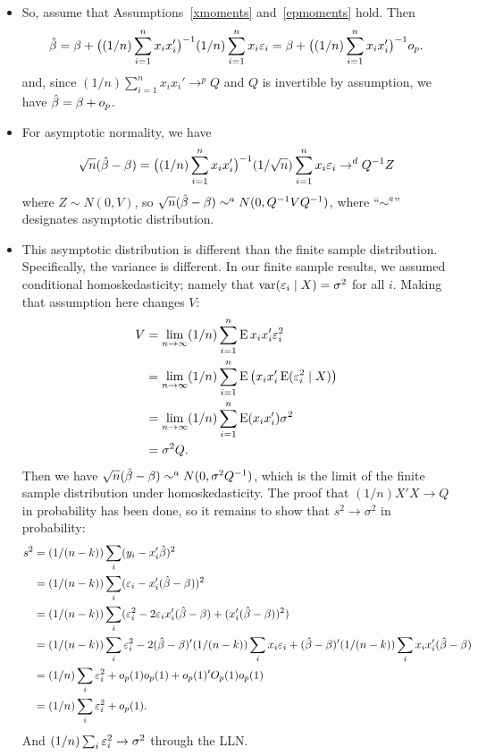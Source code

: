 \begin{itemize}
\item So, assume that Assumptions~\ref{xmoments} and~\ref{epmoments}
  hold.  Then
  \begin{equation*}
    \hat{\beta} 
    = \beta + \big( (1/n) \sum_{i=1}^n x_i x_i' \big)^{-1}
       (1/n) \sum_{i=1}^n x_i \varepsilon_i
    = \beta + \big( (1/n) \sum_{i=1}^n x_i x_i' \big)^{-1} o_p.
  \end{equation*}
  and, since $(1/n) \sum_{i=1}^n x_i x_i' \to^p Q$ and $Q$ is invertible by
  assumption, we have $\hat{\beta} = \beta + o_p$.

\item For asymptotic normality, we have
  \begin{equation*}
    \sqrt{n} (\hat{\beta} - \beta)
    = \big( (1/n) \sum_{i=1}^n x_i x_i' \big)^{-1}
      (1/\sqrt{n}) \sum_{i=1}^n x_i \varepsilon_i \to^d Q^{-1} Z
  \end{equation*}
  where $Z \sim N(0, V)$, so $\sqrt{n} (\hat{\beta} - \beta) \sim^a N(0, Q^{-1} V
  Q^{-1})$, where ``$\sim^a$'' designates asymptotic distribution.

\item This asymptotic distribution is different than the finite sample
  distribution.  Specifically, the variance is different.  In our
  finite sample results, we assumed conditional homoskedasticity;
  namely that $\operatorname{var}(\varepsilon_i \mid X) = \sigma^2$ for all $i$.  Making that
  assumption here changes $V$:
  \begin{align*}
    V
    &= \lim_{n \to \infty} (1/n) \sum_{i=1}^n \operatorname{E} x_i x_i' \varepsilon_i^2 \\
    &= \lim_{n \to \infty} (1/n) \sum_{i=1}^n \operatorname{E} \big( x_i x_i' \operatorname{E}(\varepsilon_i^2 \mid X) \big) \\
    &= \lim_{n \to \infty} (1/n) \sum_{i=1}^n \operatorname{E}( x_i x_i' ) \sigma^2 \\
    &= \sigma^2 Q.
  \end{align*}
  Then we have $\sqrt{n} (\hat{\beta} - \beta) \sim^a N(0, \sigma^2 Q^{-1})$, which is the
  limit of the finite sample distribution under homoskedasticity.  The
  proof that $(1/n) X'X \to Q$ in probability has been done, so it
  remains to show that $s^2 \to \sigma^2$ in probability:
  \begin{align*}
    s^2 &= (1/(n-k)) \sum_i (y_i - x_i'\hat{\beta})^2 \\
    &= (1/(n-k)) \sum_i (\varepsilon_i - x_i'(\hat{\beta} - \beta))^2 \\
    &= (1/(n-k)) \sum_i (\varepsilon_i^2 - 2 \varepsilon_i x_i'(\hat{\beta}-\beta) + (x_i'(\hat{\beta}-\beta))^2) \\
    &= (1/(n-k)) \sum_i \varepsilon_i^2
       - 2 (\hat{\beta} - \beta)' (1/(n-k)) \sum_i  x_i \varepsilon_i
       + (\hat{\beta} - \beta)' (1/(n-k)) \sum_i x_i x_i' (\hat{\beta} - \beta) \\
    &= (1/n) \sum_i \varepsilon_i^2 + o_p(1) o_p(1) + o_p(1)'O_p(1)o_p(1) \\
    &= (1/n) \sum_i \varepsilon_i^2 + o_p(1).
  \end{align*}
  And $(1/n) \sum_i \varepsilon_i^2 \to \sigma^2$ through the LLN.

\end{itemize}

